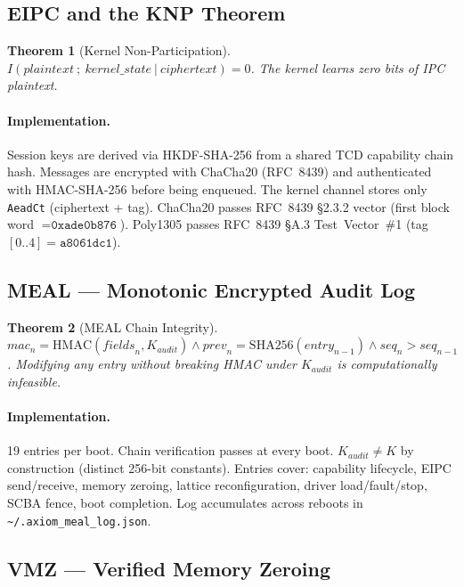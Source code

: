 \documentclass[10pt,twocolumn]{article}
\newtheorem{theorem}{Theorem}
\begin{document}
\subsection{EIPC and the KNP Theorem}

\begin{theorem}[Kernel Non-Participation]
$I(\mathit{plaintext}\ ;\ \mathit{kernel\_state}\ |\ \mathit{ciphertext}) = 0$.
The kernel learns zero bits of IPC plaintext.
\end{theorem}

\paragraph{Implementation.} Session keys are derived via HKDF-SHA-256 from
a shared TCD capability chain hash. Messages are encrypted with ChaCha20
(RFC~8439) and authenticated with HMAC-SHA-256 before being enqueued.
The kernel channel stores only \texttt{AeadCt} (ciphertext + tag).
ChaCha20 passes RFC~8439 \S2.3.2 vector (first block word $= \texttt{0xade0b876}$).
Poly1305 passes RFC~8439 \S A.3 Test~Vector~\#1
(tag$[0..4] = \texttt{a8061dc1}$).

\subsection{MEAL --- Monotonic Encrypted Audit Log}

\begin{theorem}[MEAL Chain Integrity]
$\mathit{mac}_n = \mathrm{HMAC}(\mathit{fields}_n, K_{\mathit{audit}})
\wedge \mathit{prev}_n = \mathrm{SHA256}(\mathit{entry}_{n-1})
\wedge \mathit{seq}_n > \mathit{seq}_{n-1}$.
Modifying any entry without breaking HMAC under $K_{\mathit{audit}}$ is
computationally infeasible.
\end{theorem}

\paragraph{Implementation.} 19 entries per boot. Chain verification passes
at every boot. $K_{\mathit{audit}} \neq K$ by construction (distinct
256-bit constants). Entries cover: capability lifecycle, EIPC send/receive,
memory zeroing, lattice reconfiguration, driver load/fault/stop, SCBA
fence, boot completion. Log accumulates across reboots in
\texttt{\textasciitilde/.axiom\_meal\_log.json}.

\subsection{VMZ --- Verified Memory Zeroing}
\end{document}
